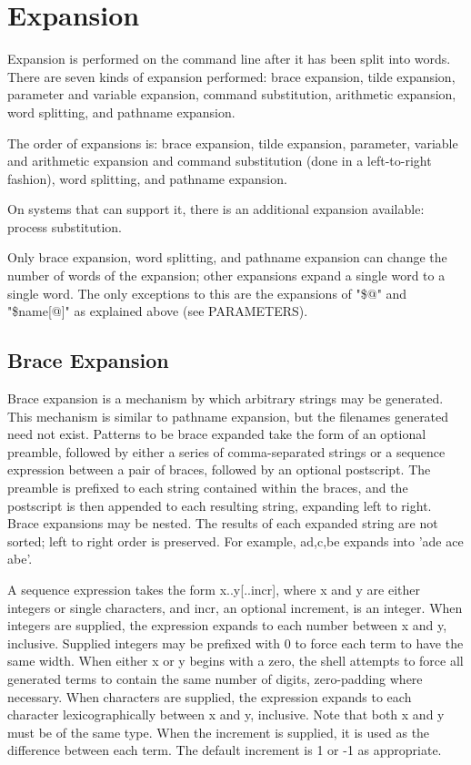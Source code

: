 \section{Expansion}\label{sec:expansion}
Expansion is performed on the command line after it has been split into words. There are seven kinds of expansion performed: brace expansion, tilde expansion, parameter and variable expansion, command substitution, arithmetic expansion, word splitting, and pathname expansion.

The order of expansions is: brace expansion, tilde expansion, parameter, variable and arithmetic expansion and command substitution (done in a left-to-right fashion), word splitting, and pathname expansion.

On systems that can support it, there is an additional expansion available: process substitution.

Only brace expansion, word splitting, and pathname expansion can change the number of words of the expansion; other expansions expand a single word to a single word. The only exceptions to this are the expansions of "\$@" and "\${name[@]}" as explained above (see PARAMETERS).

\subsection{Brace Expansion}\label{sec:braceexpansion}

Brace expansion is a mechanism by which arbitrary strings may be generated. This mechanism is similar to pathname expansion, but the filenames generated need not exist. Patterns to be brace expanded take the form of an optional preamble, followed by either a series of comma-separated strings or a sequence expression between a pair of braces, followed by an optional postscript. The preamble is prefixed to each string contained within the braces, and the postscript is then appended to each resulting string, expanding left to right.
Brace expansions may be nested. The results of each expanded string are not sorted; left to right order is preserved. For example, a{d,c,b}e expands into 'ade ace abe'.

A sequence expression takes the form {x..y[..incr]}, where x and y are either integers or single characters, and incr, an optional increment, is an integer. When integers are supplied, the expression expands to each number between x and y, inclusive. Supplied integers may be prefixed with 0 to force each term to have the same width. When either x or y begins with a zero, the shell attempts to force all generated terms to contain the same number of digits, zero-padding where necessary. When characters are supplied, the expression expands to each character lexicographically between x and y, inclusive. Note that both x and y must be of the same type. When the increment is supplied, it is used as the difference between each term. The default increment is 1 or -1 as appropriate.

